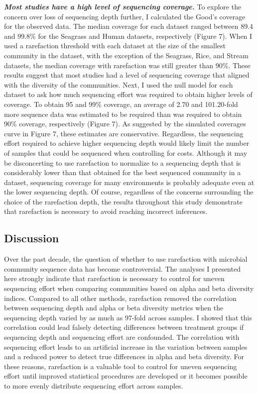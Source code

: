 \documentclass[
]{article}
\begin{document}
\textbf{\emph{Most studies have a high level of sequencing coverage.}}
To explore the concern over loss of sequencing depth further, I
calculated the Good's coverage for the observed data. The median
coverage for each dataset ranged between 89.4 and 99.8\% for the
Seagrass and Human datasets, respectively (Figure 7). When I used a
rarefaction threshold with each dataset at the size of the smallest
community in the dataset, with the exception of the Seagrass, Rice, and
Stream datasets, the median coverage with rarefaction was still greater
than 90\%. These results suggest that most studies had a level of
sequencing coverage that aligned with the diversity of the communities.
Next, I used the null model for each dataset to ask how much sequencing
effort was required to obtain higher levels of coverage. To obtain 95
and 99\% coverage, an average of 2.70 and 101.20-fold more sequence data
was estimated to be required than was required to obtain 90\% coverage,
respectively (Figure 7). As suggested by the simulated coverages curve
in Figure 7, these estimates are conservative. Regardless, the
sequencing effort required to achieve higher sequencing depth would
likely limit the number of samples that could be sequenced when
controlling for costs. Although it may be disconcerting to use
rarefaction to normalize to a sequencing depth that is considerably
lower than that obtained for the best sequenced community in a dataset,
sequencing coverage for many environments is probably adequate even at
the lower sequencing depth. Of course, regardless of the concerns
surrounding the choice of the rarefaction depth, the results throughout
this study demonstrate that rarefaction is necessary to avoid reaching
incorrect inferences.

\hypertarget{discussion}{%
\subsection{Discussion}\label{discussion}}

Over the past decade, the question of whether to use rarefaction with
microbial community sequence data has become controversial. The analyses
I presented here strongly indicate that rarefaction is necessary to
control for uneven sequencing effort when comparing communities based on
alpha and beta diversity indices. Compared to all other methods,
rarefaction removed the correlation between sequencing depth and alpha
or beta diversity metrics when the sequencing depth varied by as much as
97-fold across samples. I showed that this correlation could lead
falsely detecting differences between treatment groups if sequencing
depth and sequencing effort are confounded. The correlation with
sequencing effort leads to an artificial increase in the variation
between samples and a reduced power to detect true differences in alpha
and beta diversity. For these reasons, rarefaction is a valuable tool to
control for uneven sequencing effort until improved statistical
procedures are developed or it becomes possible to more evenly
distribute sequencing effort across samples.
\end{document}
